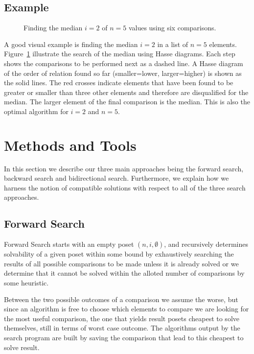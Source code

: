\documentclass[10pt,journal,compsoc]{IEEEtran}
\begin{document}
\subsection{Example}
\begin{figure}[!b]
  \centering
  
  \caption{Finding the median $i = 2$ of $n = 5$ values using six comparisons.}
  \label{fig:median_of_5}
\end{figure}
A good visual example is finding the median $i=2$ in a list of $n = 5$ elements.
Figure~\ref{fig:median_of_5} illustrate the search of the median using Hasse diagrams.
Each step shows the comparisons to be performed next as a dashed line.
A Hasse diagram of the order of relation found so far (smaller=lower, larger=higher) is shown as the solid lines.
The red crosses indicate elements that have been found to be greater or smaller than three other elements and therefore are disqualified for the median.
The larger element of the final comparison is the median.
This is also the optimal algorithm for $i = 2$ and $n = 5$.


\section{Methods and Tools}
In this section we describe our three main approaches being the forward search, backward search and bidirectional search.
Furthermore, we explain how we harness the notion of compatible solutions with respect to all of the three search approaches.

\subsection{Forward Search}\label{chapter:forward_search}
Forward Search starts with an empty poset $(n,i,\emptyset)$, and recursively determines solvability of a given poset within some bound by exhaustively searching the results of all possible comparisons to be made unless it is already solved or we determine that it cannot be solved within the alloted number of comparisons by some heuristic.

Between the two possible outcomes of a comparison we assume the worse, but since an algorithm is free to choose which elements to compare we are looking for the most useful comparison, the one that yields result posets cheapest to solve themselves, still in terms of worst case outcome.
The algorithms output by the search program are built by saving the comparison that lead to this cheapest to solve result.
\end{document}
